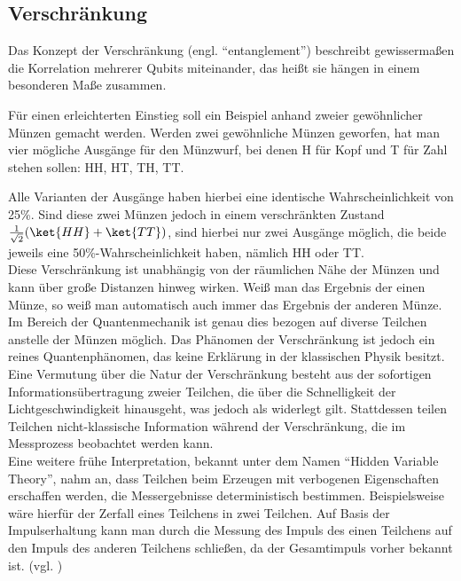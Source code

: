 \subsection{Verschränkung }
\label{sec: Verschränkung}
Das Konzept der Verschränkung (engl. ``entanglement'') beschreibt gewissermaßen die Korrelation mehrerer Qubits miteinander, das heißt sie hängen in einem besonderen Maße zusammen. 

Für einen erleichterten Einstieg soll ein Beispiel anhand zweier gewöhnlicher Münzen gemacht werden. Werden zwei gewöhnliche Münzen geworfen, hat man vier mögliche Ausgänge für den Münzwurf, bei denen H für Kopf und T für Zahl stehen sollen: HH, HT, TH, TT. 

Alle Varianten der Ausgänge haben hierbei eine identische Wahrscheinlichkeit von 25\%. Sind diese zwei Münzen jedoch in einem verschränkten Zustand  $\frac{1}{\sqrt{2}} (\ket{HH} + \ket{TT})$, sind hierbei nur zwei Ausgänge möglich, die beide jeweils eine 50\%-Wahrscheinlichkeit haben, nämlich HH oder TT. \\
  
Diese Verschränkung ist unabhängig von der räumlichen Nähe der Münzen und kann über große Distanzen hinweg wirken. Weiß man das Ergebnis der einen Münze, so weiß man automatisch auch immer das Ergebnis der anderen Münze. Im Bereich der Quantenmechanik ist genau dies bezogen auf diverse Teilchen anstelle der Münzen möglich. 
Das Phänomen der Verschränkung ist jedoch ein reines Quantenphänomen, das keine Erklärung in der klassischen Physik besitzt. \\

Eine Vermutung über die Natur der Verschränkung besteht aus der sofortigen Informationsübertragung zweier Teilchen, die über die Schnelligkeit der Lichtgeschwindigkeit hinausgeht, was jedoch als widerlegt gilt. Stattdessen teilen Teilchen nicht-klassische Information während der Verschränkung, die im Messprozess beobachtet werden kann. \\ 

Eine weitere frühe Interpretation, bekannt unter dem Namen ``Hidden Variable Theory'', nahm an, dass Teilchen beim Erzeugen mit verbogenen Eigenschaften erschaffen werden, die Messergebnisse deterministisch bestimmen. Beispielsweise wäre hierfür der Zerfall eines Teilchens in zwei Teilchen. Auf Basis der Impulserhaltung kann man durch die Messung des Impuls des einen Teilchens auf den Impuls des anderen Teilchens schließen, da der Gesamtimpuls vorher bekannt ist. 
(vgl. \cite[Ch. 7]{hughes_quantum_2021})

